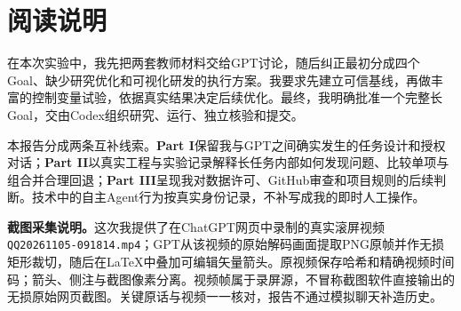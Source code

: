 \documentclass[11pt,a4paper]{article}
\begin{document}
\section*{阅读说明}
在本次实验中，我先把两套教师材料交给GPT讨论，随后纠正最初分成四个Goal、缺少研究优化和可视化研发的执行方案。我要求先建立可信基线，再做丰富的控制变量试验，依据真实结果决定后续优化。最终，我明确批准一个完整长Goal，交由Codex组织研究、运行、独立核验和提交。

本报告分成两条互补线索。\textbf{Part I}保留我与GPT之间确实发生的任务设计和授权对话；\textbf{Part II}以真实工程与实验记录解释长任务内部如何发现问题、比较单项与组合并合理回退；\textbf{Part III}呈现我对数据许可、GitHub审查和项目规则的后续判断。技术中的自主Agent行为按真实身份记录，不补写成我的即时人工操作。

\textbf{截图采集说明。}这次我提供了在ChatGPT网页中录制的真实滚屏视频 \texttt{QQ20261105-091814.mp4}\allowbreak；GPT从该视频的原始解码画面提取PNG原帧并作无损矩形裁切，随后在LaTeX中叠加可编辑矢量箭头。原视频保存哈希和精确视频时间码；箭头、侧注与截图像素分离。视频帧属于录屏源，不冒称截图软件直接输出的无损原始网页截图。关键原话与视频一一核对，报告不通过模拟聊天补造历史。

\tableofcontents\clearpage{}



\nextchapter

\nextchapter


\nextchapter



\nextchapter

\end{document}
